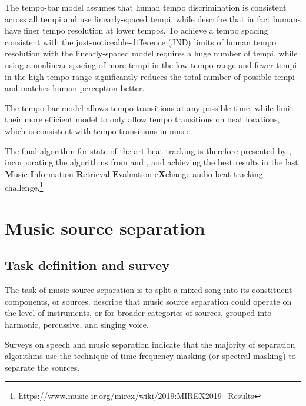 \documentclass[letter,12pt,notitlepage]{article}
\newenvironment{tight_enumerate}{
\begin{enumerate}
  \setlength{\itemsep}{0pt}
  \setlength{\parskip}{0pt}
}{\end{enumerate}}
\begin{document}
\begin{tight_enumerate}
	\vspace{-0.25em}
	\item
		The tempo-bar model assumes that human tempo discrimination is consistent across all tempi and use linearly-spaced tempi, while \textcite{bock2} describe that in fact humans have finer tempo resolution at lower tempos. To achieve a tempo spacing consistent with the just-noticeable-difference (JND) limits of human tempo resolution with the linearly-spaced model requires a huge number of tempi, while using a nonlinear spacing of more tempi in the low tempo range and fewer tempi in the high tempo range significantly reduces the total number of possible tempi and matches human perception better.
	\item
		The tempo-bar model allows tempo transitions at any possible time, while \textcite{bock2} limit their more efficient model to only allow tempo transitions on beat locations, which is consistent with tempo transitions in music.
\end{tight_enumerate}

The final algorithm for state-of-the-art beat tracking is therefore presented by \cite{bock2}, incorporating the algorithms from \cite{bock1} and \cite{bock3}, and achieving the best results in the last \textbf{M}usic \textbf{I}nformation \textbf{R}etrieval \textbf{E}valuation e\textbf{X}change audio beat tracking challenge.\footnote{\url{https://www.music-ir.org/mirex/wiki/2019:MIREX2019_Results}}


\vfill
\clearpage

\section{Music source separation}
\label{sec:musicsep}

\subsection{Task definition and survey}

The task of music source separation is to split a mixed song into its constituent components, or sources. \citet{musicsepgood} describe that music source separation could operate on the level of instruments, or for broader categories of sources, grouped into harmonic, percussive, and singing voice.

Surveys on speech \cite{speechmask} and music separation \cite{musicmask} indicate that the majority of separation algorithms use the technique of time-frequency masking (or spectral masking) to separate the sources.
\end{document}
